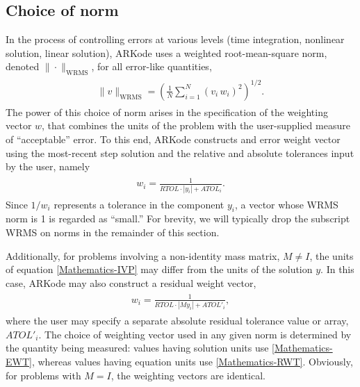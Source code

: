 \documentclass[letterpaper,10pt,english]{sphinxmanual}
\begin{document}
\subsection{Choice of norm}
\label{Mathematics:choice-of-norm}\label{Mathematics:mathematics-error-norm}
In the process of controlling errors at various levels (time
integration, nonlinear solution, linear solution), ARKode uses a
weighted root-mean-square norm, denoted
\(\|\cdot\|_\text{WRMS}\), for all error-like quantities,
\label{Mathematics:equation-WRMS_NORM}\begin{gather}
\begin{split}\|v\|_\text{WRMS} = \left( \frac{1}{N} \sum_{i=1}^N \left(v_i\,
w_i\right)^2\right)^{1/2}.\end{split}\label{Mathematics-WRMS_NORM}
\end{gather}
The power of this choice of norm arises in the specification of the
weighting vector \(w\), that combines the units of the problem
with the user-supplied measure of ``acceptable'' error.  To this end,
ARKode constructs and error weight vector using the
most-recent step solution and the relative and absolute tolerances
input by the user, namely
\label{Mathematics:equation-EWT}\begin{gather}
\begin{split}w_i = \frac{1}{RTOL\cdot |y_i| + ATOL_i}.\end{split}\label{Mathematics-EWT}
\end{gather}
Since \(1/w_i\) represents a tolerance in the component
\(y_i\), a vector whose WRMS norm is 1 is regarded as ``small.'' For
brevity, we will typically drop the subscript WRMS on norms in the
remainder of this section.

Additionally, for problems involving a non-identity mass matrix,
\(M\ne I\), the units of equation \eqref{Mathematics-IVP} may differ from the
units of the solution \(y\).  In this case, ARKode may also
construct a residual weight vector,
\label{Mathematics:equation-RWT}\begin{gather}
\begin{split}w_i = \frac{1}{RTOL\cdot |My_i| + ATOL'_i},\end{split}\label{Mathematics-RWT}
\end{gather}
where the user may specify a separate absolute residual tolerance
value or array, \(ATOL'_i\).  The choice of weighting vector used
in any given norm is determined by the quantity being measured: values
having solution units use \eqref{Mathematics-EWT}, whereas values having equation
units use \eqref{Mathematics-RWT}.  Obviously, for problems with \(M=I\), the
weighting vectors are identical.
\end{document}
